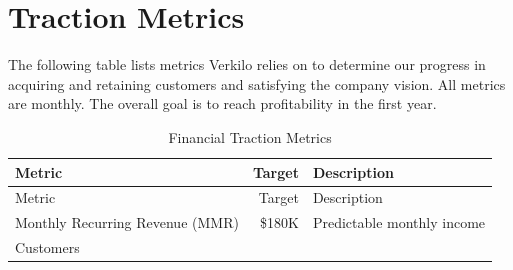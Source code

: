 \documentclass[10pt,openany]{book}
\begin{document}
\newpage

\hypertarget{traction-metrics}{%
\section{Traction Metrics}\label{traction-metrics}}

The following table lists metrics Verkilo relies on to determine our
progress in acquiring and retaining customers and satisfying the company
vision. All metrics are monthly. The overall goal is to reach
profitability in the first year.

\begin{longtable}[]{@{}lrl@{}}
\caption{Financial Traction Metrics}\tabularnewline
\toprule
\begin{minipage}[b]{0.35\columnwidth}\raggedright
Metric\strut
\end{minipage} & \begin{minipage}[b]{0.08\columnwidth}\raggedleft
Target\strut
\end{minipage} & \begin{minipage}[b]{0.48\columnwidth}\raggedright
Description\strut
\end{minipage}\tabularnewline
\midrule
\endfirsthead
\toprule
\begin{minipage}[b]{0.35\columnwidth}\raggedright
Metric\strut
\end{minipage} & \begin{minipage}[b]{0.08\columnwidth}\raggedleft
Target\strut
\end{minipage} & \begin{minipage}[b]{0.48\columnwidth}\raggedright
Description\strut
\end{minipage}\tabularnewline
\midrule
\endhead
\begin{minipage}[t]{0.35\columnwidth}\raggedright
Monthly Recurring Revenue (MMR)\strut
\end{minipage} & \begin{minipage}[t]{0.08\columnwidth}\raggedleft
\$180K\strut
\end{minipage} & \begin{minipage}[t]{0.48\columnwidth}\raggedright
Predictable monthly income\strut
\end{minipage}\tabularnewline
\begin{minipage}[t]{0.35\columnwidth}\raggedright
Customers\strut
\end{minipage} & \begin{minipage}[t]{0.08\columnwidth}\raggedleft
2250\strut
\end{minipage} & \begin{minipage}[t]{0.48\columnwidth}\raggedright

\end{minipage}
\end{longtable}
\end{document}
